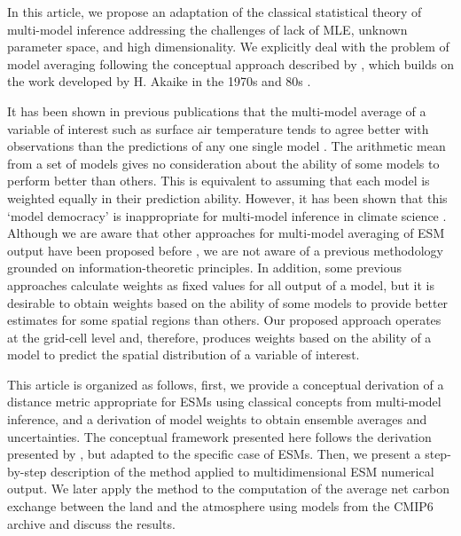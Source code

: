 \documentclass[gmd, manuscript]{copernicus}
\begin{document}
In this article, we propose an adaptation of the classical statistical theory of multi-model inference addressing the challenges of lack of MLE, unknown parameter space, and high dimensionality. We explicitly deal with the problem of model averaging following the conceptual approach described by \citet{Burnham2002}, which builds on the work developed by H. Akaike in the 1970s and 80s \citep{Parzen1998}.

It has been shown in previous publications that the multi-model average of a variable of interest such as surface air temperature tends to agree better with observations than the predictions of any one single model \citep{Doblas-Reyes2003, Hagedorn2005, Elvidge2023}. The arithmetic mean from a set of models gives no consideration about the ability of some models to perform better than others. This is equivalent to assuming that each model is weighted equally in their prediction ability. However, it has been shown that this `model democracy' is inappropriate for multi-model inference in climate science \citep{Knutti2010CC, Knutti2017}. Although we are aware that other approaches for multi-model averaging of ESM output have been proposed before \citep[e.g.,][]{Knutti2017, Ribes2021, Sanderson2015, Giorgi2002, Tebaldi2007, Tebaldi2005, Merrifield2020, Elvidge2023}, we are not aware of a previous methodology grounded on information-theoretic principles. In addition, some previous approaches calculate weights as fixed values for all output of a model, but it is desirable to obtain weights based on the ability of some models to provide better estimates for some spatial regions than others. Our proposed approach operates at the grid-cell level and, therefore, produces weights based on the ability of a model to predict the spatial distribution of a variable of interest.

This article is organized as follows, first, we provide a conceptual derivation of a distance metric appropriate for ESMs using classical concepts from multi-model inference, and a derivation of model weights to obtain ensemble averages and uncertainties. The conceptual framework presented here follows the derivation presented by \citet{Burnham2002}, but adapted to the specific case of ESMs. Then, we present a step-by-step description of the method applied to multidimensional ESM numerical output. We later apply the method to the computation of the average net carbon exchange between the land and the atmosphere using models from the CMIP6 archive and discuss the results. 
\end{document}
